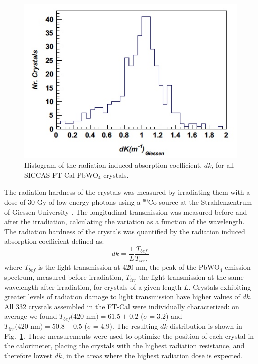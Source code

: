 \begin{figure}[th!]
\centering 
\includegraphics[width=0.85\columnwidth]{./fig/dk.jpeg} 
\caption{Histogram of the radiation induced absorption coefficient, $dk$, for all SICCAS FT-Cal
 PbWO$_4$ crystals.}
\label{fig:dk} 
\end{figure}
The radiation hardness of the crystals was measured  by irradiating them with a dose of 30 Gy of  low-energy photons using a $^{60}$Co source at the Strahlenzentrum of Giessen University \cite{radhard}. The longitudinal transmission was measured before and after the irradiation, calculating the variation as a function of the wavelength. The radiation hardness of the crystals was quantified by the radiation induced absorption coefficient defined as:
\begin{equation}
dk = \frac{1}{L}\frac{T_{bef}}{T_{irr},}
\end{equation}
where $T_{bef}$ is the light transmission at 420 nm, the peak of the PbWO$_4$ emission spectrum, measured before irradiation, $T_{irr}$ the light transmission at the same wavelength after irradiation, for crystals of a given length $L$. 
Crystals exhibiting greater levels of radiation damage to light transmission have higher values of $dk$. 
All 332 crystals assembled in the FT-Cal were individually characterized: on average we found 
$T_{bef}\textrm{(420 nm)} = 61.5 \pm 0.2$ ($\sigma=3.2$) and 
$T_{irr}\textrm{(420 nm)} = 50.8 \pm 0.5$ ($\sigma=4.9$). 
The resulting $dk$ distribution is shown in Fig.~\ref{fig:dk}.
These measurements were used to optimize the position of each crystal in the calorimeter, placing the crystals with the highest radiation resistance, and therefore lowest $dk$, in the areas where the highest radiation dose is expected.

